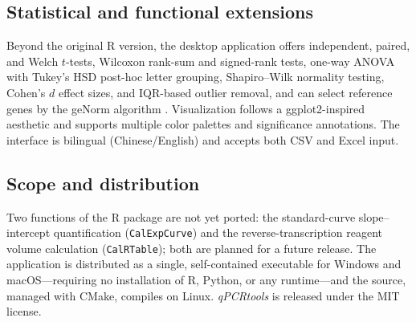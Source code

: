 \subsection{Statistical and functional extensions}

Beyond the original R version, the desktop application offers independent,
paired, and Welch $t$-tests, Wilcoxon rank-sum and signed-rank tests,
one-way ANOVA with Tukey's HSD post-hoc letter grouping, Shapiro--Wilk
normality testing, Cohen's $d$ effect sizes, and IQR-based outlier removal,
and can select reference genes by the geNorm algorithm
\cite{vandesompele2002accurate}. Visualization follows a ggplot2-inspired
aesthetic \cite{wickham2016ggplot2} and supports multiple color palettes and
significance annotations. The interface is bilingual (Chinese/English) and
accepts both CSV and Excel input.

\subsection{Scope and distribution}

Two functions of the R package are not yet ported: the standard-curve
slope--intercept quantification (\texttt{CalExpCurve}) and the
reverse-transcription reagent volume calculation (\texttt{CalRTable}); both
are planned for a future release. The application is distributed as a
single, self-contained executable for Windows and macOS---requiring no
installation of R, Python, or any runtime---and the source, managed with
CMake, compiles on Linux. \textit{qPCRtools} is released under the MIT
license.
